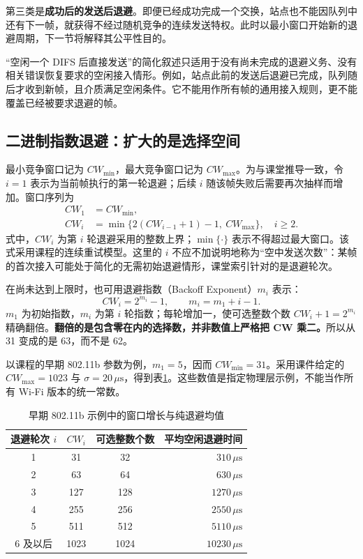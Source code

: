 第三类是\textbf{成功后的发送后退避}。即便已经成功完成一个交换，站点也不能因队列中还有下一帧，就获得不经过随机竞争的连续发送特权。此时以最小窗口开始新的退避周期，下一节将解释其公平性目的。

“空闲一个 DIFS 后直接发送”的简化叙述只适用于没有尚未完成的退避义务、没有相关错误恢复要求的空闲接入情形。例如，站点此前的发送后退避已完成，队列随后才收到新帧，且介质满足空闲条件。它不能用作所有帧的通用接入规则，更不能覆盖已经被要求退避的帧。

\subsection{二进制指数退避：扩大的是选择空间}

最小竞争窗口记为 $CW_{\min}$，最大竞争窗口记为 $CW_{\max}$。为与课堂推导一致，令 $i=1$ 表示为当前帧执行的第一轮退避；后续 $i$ 随该帧失败后需要再次抽样而增加。窗口序列为
\begin{align}
CW_1&=CW_{\min},\\
CW_i&=\min\{2(CW_{i-1}+1)-1,\ CW_{\max}\},\quad i\geq2.
\label{eq:cw-recursion}
\end{align}
式中，$CW_i$ 为第 $i$ 轮退避采用的整数上界；$\min\{\cdot\}$ 表示不得超过最大窗口。该式采用课程的连续重试模型。这里的 $i$ 不应不加说明地称为“空中发送次数”：某帧的首次接入可能处于简化的无需初始退避情形，课堂索引针对的是退避轮次。

在尚未达到上限时，也可用退避指数（Backoff Exponent）$m_i$ 表示：
\begin{equation}
CW_i=2^{m_i}-1,\qquad m_i=m_1+i-1.
\label{eq:backoff-exp}
\end{equation}
$m_1$ 为初始指数，$m_i$ 为第 $i$ 轮指数；每轮增加一，使可选整数个数 $CW_i+1=2^{m_i}$ 精确翻倍。\textbf{翻倍的是包含零在内的选择数，并非数值上严格把 CW 乘二。}所以从 31 变成的是 63，而不是 62。

以课程的早期 802.11b 参数为例，$m_1=5$，因而 $CW_{\min}=31$。采用课件给定的 $CW_{\max}=1023$ 与 $\sigma=20\,\mu\mathrm{s}$，得到表\ref{tab:cw-growth}。这些数值是指定物理层示例，不能当作所有 Wi-Fi 版本的统一常数。

\begin{table}[htbp]
\centering
\caption{早期 802.11b 示例中的窗口增长与纯退避均值}
\label{tab:cw-growth}
\begin{tabular}{cccr}
\toprule
退避轮次 $i$ & $CW_i$ & 可选整数个数 & 平均空闲退避时间\\
\midrule
1 & 31 & 32 & $310\,\mu\mathrm{s}$\\
2 & 63 & 64 & $630\,\mu\mathrm{s}$\\
3 & 127 & 128 & $1270\,\mu\mathrm{s}$\\
4 & 255 & 256 & $2550\,\mu\mathrm{s}$\\
5 & 511 & 512 & $5110\,\mu\mathrm{s}$\\
6 及以后 & 1023 & 1024 & $10230\,\mu\mathrm{s}$\\
\bottomrule
\end{tabular}
\end{table}

